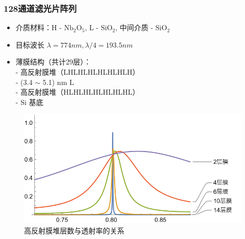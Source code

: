 \begin{frame}[c]
    \frametitle{128通道滤光片阵列}
    \begin{itemize}
        \item 介质材料：H - $\mathrm{Nb_2O_5}$, L - $\mathrm{SiO_2}$, 中间介质 - $\mathrm{SiO_2}$
        \item 目标波长 $\lambda = 774 nm, \lambda/4 = 193.5 nm$
        \item 薄膜结构（共计29层）：\\- 高反射膜堆（LHLHLHLHLHLHLH）\\- (3.4 $\sim$ 5.1) nm L\\- 高反射膜堆（HLHLHLHLHLHLHL）\\- $\mathrm{Si}$ 基底
    \end{itemize}
    \begin{figure}[H] %
        \centering %
        \includegraphics[width=.9\textwidth]{figures/128 channels of integrated filter array rapidly fabricated by using the combinatorial deposition technique_4.png} %
        \caption{高反射膜堆层数与透射率的关系} %
    \end{figure}
\end{frame}